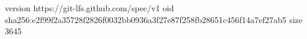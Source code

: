 version https://git-lfs.github.com/spec/v1
oid sha256:e2f99f2a35728f2826f0032bb0936a3f27e87f258fb28651c456f14a7ef27ab5
size 3645
